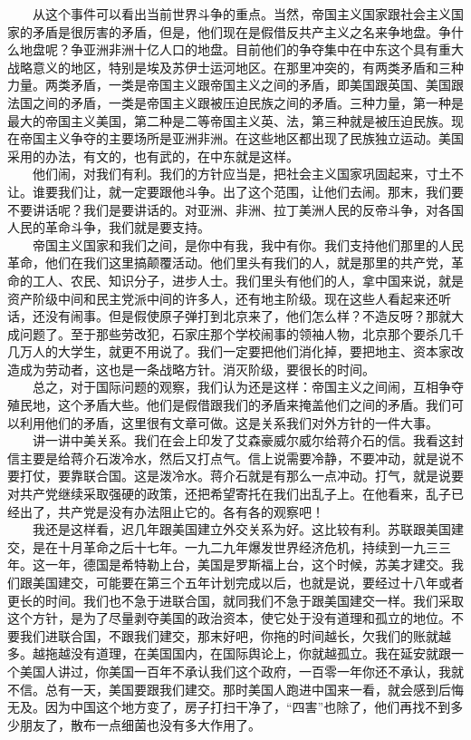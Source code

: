 \documentclass[cn,11pt,chinese]{elegantbook}
\begin{document}
　　从这个事件可以看出当前世界斗争的重点。当然，帝国主义国家跟社会主义国家的矛盾是很厉害的矛盾，但是，他们现在是假借反共产主义之名来争地盘。争什么地盘呢？争亚洲非洲十亿人口的地盘。目前他们的争夺集中在中东这个具有重大战略意义的地区，特别是埃及苏伊士运河地区。在那里冲突的，有两类矛盾和三种力量。两类矛盾，一类是帝国主义跟帝国主义之间的矛盾，即美国跟英国、美国跟法国之间的矛盾，一类是帝国主义跟被压迫民族之间的矛盾。三种力量，第一种是最大的帝国主义美国，第二种是二等帝国主义英、法，第三种就是被压迫民族。现在帝国主义争夺的主要场所是亚洲非洲。在这些地区都出现了民族独立运动。美国采用的办法，有文的，也有武的，在中东就是这样。\\
　　他们闹，对我们有利。我们的方针应当是，把社会主义国家巩固起来，寸土不让。谁要我们让，就一定要跟他斗争。出了这个范围，让他们去闹。那末，我们要不要讲话呢？我们是要讲话的。对亚洲、非洲、拉丁美洲人民的反帝斗争，对各国人民的革命斗争，我们就是要支持。\\
　　帝国主义国家和我们之间，是你中有我，我中有你。我们支持他们那里的人民革命，他们在我们这里搞颠覆活动。他们里头有我们的人，就是那里的共产党，革命的工人、农民、知识分子，进步人士。我们里头有他们的人，拿中国来说，就是资产阶级中间和民主党派中间的许多人，还有地主阶级。现在这些人看起来还听话，还没有闹事。但是假使原子弹打到北京来了，他们怎么样？不造反呀？那就大成问题了。至于那些劳改犯，石家庄那个学校闹事的领袖人物，北京那个要杀几千几万人的大学生，就更不用说了。我们一定要把他们消化掉，要把地主、资本家改造成为劳动者，这也是一条战略方针。消灭阶级，要很长的时间。\\
　　总之，对于国际问题的观察，我们认为还是这样：帝国主义之间闹，互相争夺殖民地，这个矛盾大些。他们是假借跟我们的矛盾来掩盖他们之间的矛盾。我们可以利用他们的矛盾，这里很有文章可做。这是关系我们对外方针的一件大事。\\
　　讲一讲中美关系。我们在会上印发了艾森豪威尔威尔给蒋介石的信。我看这封信主要是给蒋介石泼冷水，然后又打点气。信上说需要冷静，不要冲动，就是说不要打仗，要靠联合国。这是泼冷水。蒋介石就是有那么一点冲动。打气，就是说要对共产党继续采取强硬的政策，还把希望寄托在我们出乱子上。在他看来，乱子已经出了，共产党是没有办法阻止它的。各有各的观察吧！\\
　　我还是这样看，迟几年跟美国建立外交关系为好。这比较有利。苏联跟美国建交，是在十月革命之后十七年。一九二九年爆发世界经济危机，持续到一九三三年。这一年，德国是希特勒上台，美国是罗斯福上台，这个时候，苏美才建交。我们跟美国建交，可能要在第三个五年计划完成以后，也就是说，要经过十八年或者更长的时间。我们也不急于进联合国，就同我们不急于跟美国建交一样。我们采取这个方针，是为了尽量剥夺美国的政治资本，使它处于没有道理和孤立的地位。不要我们进联合国，不跟我们建交，那末好吧，你拖的时间越长，欠我们的账就越多。越拖越没有道理，在美国国内，在国际舆论上，你就越孤立。我在延安就跟一个美国人讲过，你美国一百年不承认我们这个政府，一百零一年你还不承认，我就不信。总有一天，美国要跟我们建交。那时美国人跑进中国来一看，就会感到后悔无及。因为中国这个地方变了，房子打扫干净了，“四害”也除了，他们再找不到多少朋友了，散布一点细菌也没有多大作用了。\\
\end{document}
